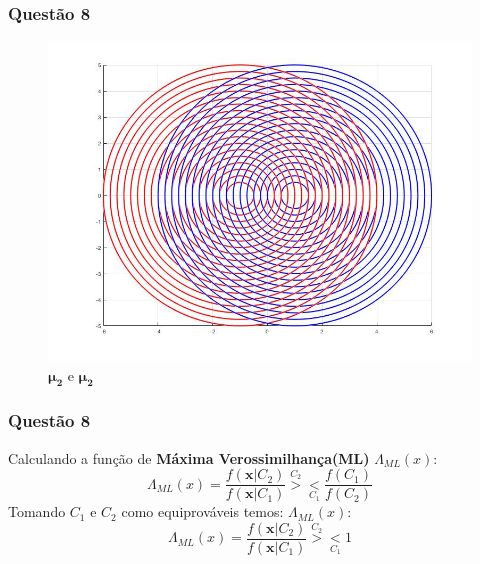 \documentclass{beamer}\usepackage[]{graphicx}\usepackage[]{color}
\begin{document}
		\begin{frame}
			\frametitle{Questão 8}
			\begin{figure}[h]
				\centering
				\includegraphics[scale=0.3]{lista2_3.jpeg}
				\caption{$\boldsymbol{\mu_{2}}$ e $\boldsymbol{\mu_{2}}$}
			\end{figure}
		\end{frame}
	
		\begin{frame}
			\frametitle{Questão 8}
			Calculando a função de \textbf{Máxima Verossimilhança(ML)} $\Lambda_{ML}(x)$:
			$$\Lambda_{ML}(x) = \frac{f(\boldsymbol{x}|C_{2})}{f(\boldsymbol{x}|C_{1})} \overset{C_{2}}{>} \underset{C_{1}}{<} \frac{f(C_{1})}{f(C_{2})}$$
			Tomando $C_{1}$ e $C_{2}$ como equiprováveis temos:
			$\Lambda_{ML}(x)$:
			$$\Lambda_{ML}(x) = \frac{f(\boldsymbol{x}|C_{2})}{f(\boldsymbol{x}|C_{1})} \overset{C_{2}}{>} \underset{C_{1}}{<} 1$$
		\end{frame}
		
\end{document}
